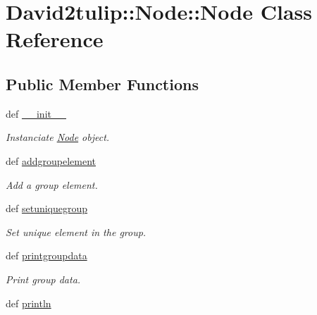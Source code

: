 \hypertarget{classDavid2tulip_1_1Node_1_1Node}{
\section{\-David2tulip\-:\-:\-Node\-:\-:\-Node \-Class \-Reference}
\label{classDavid2tulip_1_1Node_1_1Node}
}
\subsection*{\-Public \-Member \-Functions}
\begin{DoxyCompactItemize}
\item 
def \hyperlink{classDavid2tulip_1_1Node_1_1Node_a008a7a3a68634c938b4a9f3e4db3a99e}{\-\_\-\-\_\-init\-\_\-\-\_\-}
\begin{DoxyCompactList}\small\item\em \-Instanciate \hyperlink{classDavid2tulip_1_1Node_1_1Node}{\-Node} object. \end{DoxyCompactList}\item 
def \hyperlink{classDavid2tulip_1_1Node_1_1Node_a2553b887a3f29f1de5ab544472849e55}{addgroupelement}
\begin{DoxyCompactList}\small\item\em \-Add a group element. \end{DoxyCompactList}\item 
\hypertarget{classDavid2tulip_1_1Node_1_1Node_af290fb5f12f670eb30f9392777e7a1db}{
def \hyperlink{classDavid2tulip_1_1Node_1_1Node_af290fb5f12f670eb30f9392777e7a1db}{setuniquegroup}}
\label{classDavid2tulip_1_1Node_1_1Node_af290fb5f12f670eb30f9392777e7a1db}

\begin{DoxyCompactList}\small\item\em \-Set unique element in the group. \end{DoxyCompactList}\item 
\hypertarget{classDavid2tulip_1_1Node_1_1Node_a1799f421bc095eea44d3c1cf30e5942b}{
def \hyperlink{classDavid2tulip_1_1Node_1_1Node_a1799f421bc095eea44d3c1cf30e5942b}{printgroupdata}}
\label{classDavid2tulip_1_1Node_1_1Node_a1799f421bc095eea44d3c1cf30e5942b}

\begin{DoxyCompactList}\small\item\em \-Print group data. \end{DoxyCompactList}\item 
\hypertarget{classDavid2tulip_1_1Node_1_1Node_a1b74a4206857e8de1617dd9c1d9586d7}{
def \hyperlink{classDavid2tulip_1_1Node_1_1Node_a1b74a4206857e8de1617dd9c1d9586d7}{println}}
\label{classDavid2tulip_1_1Node_1_1Node_a1b74a4206857e8de1617dd9c1d9586d7}


\end{DoxyCompactItemize}
